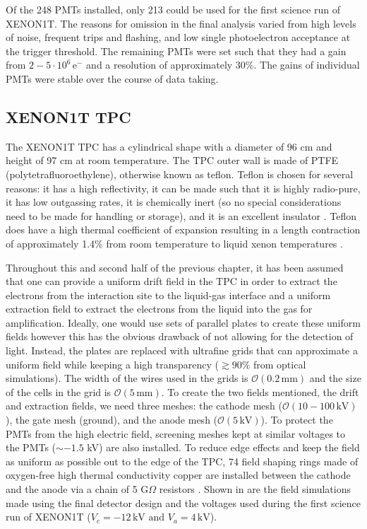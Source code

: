  Of the 248 PMTs installed, only 213 could be used for the first science run of XENON1T.  The reasons for omission in the final analysis varied from high levels of noise, frequent trips and flashing, and low single photoelectron acceptance at the trigger threshold.  The remaining PMTs were set such that they had a gain from $2- 5 \cdot 10^6 \, \textrm{e}^-$ and a resolution of approximately 30\%.  The gains of individual PMTs were stable over the course of data taking.
 
 
  \subsection{XENON1T TPC}
 \label{sec:xe1t_tpc}

The XENON1T TPC has a cylindrical shape with a diameter of 96 cm and height of 97 cm at room temperature.  The TPC outer wall is made of PTFE (polytetrafluoroethylene), otherwise known as teflon.  Teflon is chosen for several reasons: it has a high reflectivity, it can be made such that it is highly radio-pure, it has low outgassing rates, it is chemically inert (so no special considerations need to be made for handling or storage), and it is an excellent insulator \cite{neves2017measurement}.  Teflon does have a high thermal coefficient of expansion resulting in a length contraction of approximately 1.4\% from room temperature to liquid xenon temperatures \cite{kirby1956thermal}.

Throughout this and second half of the previous chapter, it has been assumed that one can provide a uniform drift field in the TPC in order to extract the electrons from the interaction site to the liquid-gas interface and a uniform extraction field to extract the electrons from the liquid into the gas for amplification.  Ideally, one would use sets of parallel plates to create these uniform fields however this has the obvious drawback of not allowing for the detection of light.  Instead, the plates are replaced with ultrafine grids that can approximate a uniform field while keeping a high transparency ($\gtrsim 90 \%$ from optical simulations).  The width of the wires used in the grids is $\mathcal{O}(0.2 \, \textrm{mm})$ and the size of the cells in the grid is $\mathcal{O}(5 \, \textrm{mm})$.  To create the two fields mentioned, the drift and extraction fields, we need three meshes: the cathode mesh ($\mathcal{O}(10-100 \, \textrm{kV})$), the gate mesh (ground), and the anode mesh ($\mathcal{O}(5 \, \textrm{kV})$).  To protect the PMTs from the high electric field, screening meshes kept at similar voltages to the PMTs ($\sim -1.5$ kV) are also installed.  To reduce edge effects and keep the field as uniform as possible out to the edge of the TPC, 74 field shaping rings made of oxygen-free high thermal conductivity copper are installed between the cathode and the anode via a chain of 5 G$\Omega$ resistors \cite{aprile2017xenon1t}.  Shown in  are the field simulations made using the final detector design and the voltages used during the first science run of XENON1T ($V_c = -12 \, \textrm{kV} \textrm{ and } V_a = 4 \, \textrm{kV}$).  

